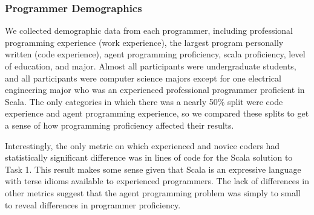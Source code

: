 \subsubsection{Programmer Demographics}

We collected demographic data from each programmer, including professional programming experience (work experience), the largest program personally written (code experience), agent programming proficiency, scala proficiency, level of education, and major. Almost all participants were undergraduate students, and all participants were computer science majors except for one electrical engineering major who was an experienced professional programmer proficient in Scala. The only categories in which there was a nearly 50\% split were code experience and agent programming experience, so we compared these splits to get a sense of how programming proficiency affected their results.

Interestingly, the only metric on which experienced and novice coders had statistically significant difference was in lines of code for the Scala solution to Task 1. This result makes some sense given that Scala is an expressive language with terse idioms available to experienced programmers. The lack of differences in other metrics suggest that the agent programming problem was simply to small to reveal differences in programmer proficiency.

